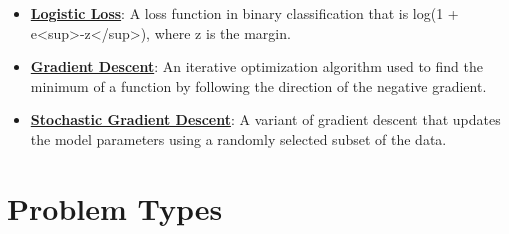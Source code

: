 \documentclass{article}%
\begin{document}
\begin{itemize}[leftmargin=*]
\item \href{https://purdue.brightspace.com/d2l/common/assets/pdfjs-d2l-dist/1.0.14-legacy/web/viewer.html?file=\%2Fcontent\%2Fenforced\%2F1095467-wl.202510.CS.24300.001\%2F05L2-ML Basics.pdf\%3Fou\%3D1095467\&lang=en-us\&container=d2l-fileviewer-rendered-pdf\&fullscreen=d2l-fileviewer-rendered-pdf-dialog\&height=667#page=27}{\textbf{Logistic Loss}}: A loss function in binary classification that is log(1 + e\textless{}sup\textgreater{}{-}z\textless{}/sup\textgreater{}), where z is the margin.%
\item \href{https://purdue.brightspace.com/d2l/common/assets/pdfjs-d2l-dist/1.0.14-legacy/web/viewer.html?file=\%2Fcontent\%2Fenforced\%2F1095467-wl.202510.CS.24300.001\%2F05L2-ML Basics.pdf\%3Fou\%3D1095467\&lang=en-us\&container=d2l-fileviewer-rendered-pdf\&fullscreen=d2l-fileviewer-rendered-pdf-dialog\&height=667#page=28}{\textbf{Gradient Descent}}: An iterative optimization algorithm used to find the minimum of a function by following the direction of the negative gradient.%
\item \href{https://purdue.brightspace.com/d2l/common/assets/pdfjs-d2l-dist/1.0.14-legacy/web/viewer.html?file=\%2Fcontent\%2Fenforced\%2F1095467-wl.202510.CS.24300.001\%2F05L2-ML Basics.pdf\%3Fou\%3D1095467\&lang=en-us\&container=d2l-fileviewer-rendered-pdf\&fullscreen=d2l-fileviewer-rendered-pdf-dialog\&height=667#page=29}{\textbf{Stochastic Gradient Descent}}: A variant of gradient descent that updates the model parameters using a randomly selected subset of the data.%
\end{itemize}

%
\section{Problem Types}%
\label{sec:ProblemTypes}%
\end{document}

